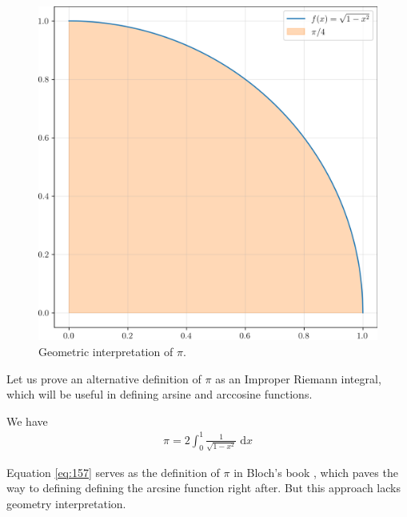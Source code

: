 \documentclass[thmcnt=section, 12pt]{my-elegantbook}
\begin{document}
\begin{figure}[ht]
    \centering
    \includegraphics[scale=0.5]{figures/ma-019.png}
    \caption{Geometric interpretation of $\pi$.}
    \label{fig:19}
\end{figure}


Let us prove an alternative definition of $\pi$
as an Improper Riemann integral,
which will be useful in defining arsine and arccosine functions.

\begin{theorem} \label{thm:92}
    We have
    \begin{align}
        \pi = 2 \int_0^1 \frac{1}{\sqrt{1 - x^2}} \; \mathrm{d} x
        \label{eq:157}
    \end{align}
\end{theorem}

\begin{note}
    Equation \eqref{eq:157} serves as the definition of $\pi$
    in Bloch's book \cite{blochRealNumbersReal2011},
    which paves the way to defining defining the arcsine function
    right after.
    But this approach lacks geometry interpretation.
\end{note}
\end{document}
